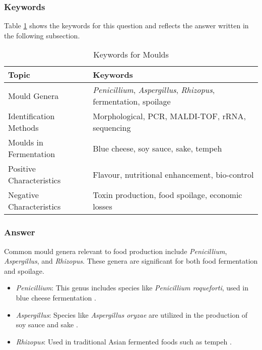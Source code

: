 \subsubsection*{Keywords}
Table \ref{tab:KW-Moulds} shows the keywords for this question and reflects the answer written in the following subsection.
\begin{table}[h]
    \centering
    \caption{Keywords for Moulds} 
    \label{tab:KW-Moulds}
    \begin{tabular}{l|l}
        \textbf{Topic} & \textbf{Keywords} \\
        \hline
        Mould Genera & \textit{Penicillium}, \textit{Aspergillus}, \textit{Rhizopus}, fermentation, spoilage \\

        Identification Methods & Morphological, PCR, MALDI-TOF, rRNA, sequencing \\

        Moulds in Fermentation & Blue cheese, soy sauce, sake, tempeh \\

        Positive Characteristics & Flavour, nutritional enhancement, bio-control \\

        Negative Characteristics & Toxin production, food spoilage, economic losses\\
    \end{tabular}
\end{table}

\subsubsection*{Answer}
Common mould genera relevant to food production include \textit{Penicillium}, \textit{Aspergillus}, and \textit{Rhizopus}. These genera are significant for both food fermentation and spoilage.
\begin{itemize}
    \item \textit{Penicillium}: This genus includes species like \textit{Penicillium roqueforti}, used in blue cheese fermentation \cite*{L8-MicroInFood}.
    \item \textit{Aspergillus}: Species like \textit{Aspergillus oryzae} are utilized in the production of soy sauce and sake \cite*{L1-DiversityMicro}.
    \item \textit{Rhizopus}: Used in traditional Asian fermented foods such as tempeh \cite*{L1-DiversityMicro,LS03}.
\end{itemize}

